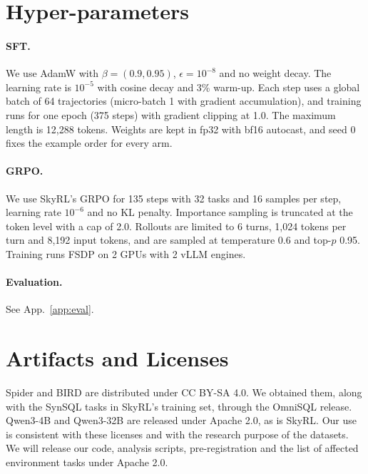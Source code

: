 \section{Hyper-parameters}
\label{app:hparams}

\paragraph{SFT.}
We use AdamW with $\beta=(0.9,0.95)$, $\epsilon=10^{-8}$ and no weight decay. The learning rate is $10^{-5}$ with cosine decay and 3\% warm-up. Each step uses a global batch of 64 trajectories (micro-batch 1 with gradient accumulation), and training runs for one epoch (375 steps) with gradient clipping at 1.0. The maximum length is 12,288 tokens. Weights are kept in fp32 with bf16 autocast, and seed 0 fixes the example order for every arm.

\paragraph{GRPO.}
We use SkyRL's GRPO for 135 steps with 32 tasks and 16 samples per step, learning rate $10^{-6}$ and no KL penalty. Importance sampling is truncated at the token level with a cap of 2.0. Rollouts are limited to 6 turns, 1,024 tokens per turn and 8,192 input tokens, and are sampled at temperature 0.6 and top-$p$ 0.95. Training runs FSDP on 2 GPUs with 2 vLLM engines.

\paragraph{Evaluation.}
See App.~\ref{app:eval}.

\section{Artifacts and Licenses}
\label{app:licenses}

Spider and BIRD are distributed under CC BY-SA 4.0. We obtained them, along with the SynSQL tasks in SkyRL's training set, through the OmniSQL release. Qwen3-4B and Qwen3-32B are released under Apache 2.0, as is SkyRL. Our use is consistent with these licenses and with the research purpose of the datasets. We will release our code, analysis scripts, pre-registration and the list of affected environment tasks under Apache 2.0.
